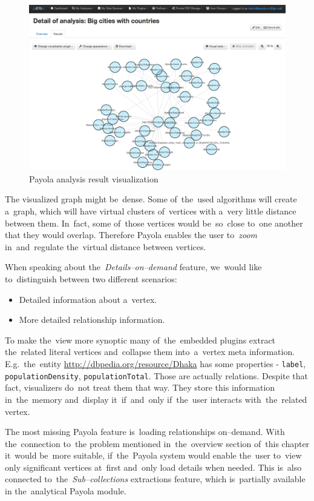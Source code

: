 \begin{figure}
	\centering
	\includegraphics[width=140mm]{img/payola.png}
	\caption{Payola analysis result visualization}
	\label{fig:palyola-vis}
\end{figure}


The visualized graph might be~dense. Some of~the~used algorithms will create a~graph, which
will have virtual clusters of~vertices with a~very little distance between them. In~fact, some of~those
vertices would be~so~close to~one another that they would overlap. Therefore Payola enables the
user to~\emph{zoom} in~and~regulate the~virtual distance between vertices.

When speaking about the~\emph{Details--on--demand} feature, we~would like to~distinguish
between two different
scenarios:

\begin{itemize}
\item Detailed information about a~vertex.
\item More detailed relationship information.
\end{itemize}

To make the~view more synoptic many of~the~embedded plugins extract the~related literal
vertices and~collapse them into~a~vertex meta information. E.g.~the~entity
\url{http://dbpedia.org/resource/Dhaka} has some properties - \texttt{label},
\texttt{populationDensity}, \texttt{populationTotal}.
Those are actually relations. Despite that fact, visualizers do~not treat them
that way. They store this information in~the~memory and~display it~if~and~only if~the~user
interacts with~the~related vertex.

The most missing Payola feature is~loading relationships on--demand. With the~connection to~the
problem
mentioned in~the~overview section of~this chapter it~would be~more suitable, if~the~Payola system
would enable the~user to~view only significant vertices at~first and~only load details when needed.
This is~also connected to~the~\emph{Sub--collections} extractions feature, which is~partially available
in the~analytical Payola module.


